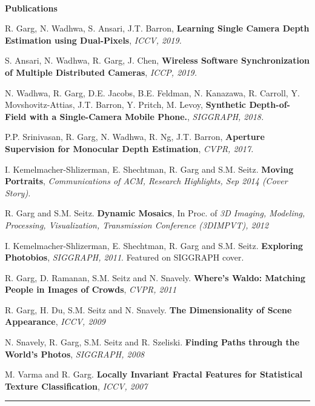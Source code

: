 \documentclass[10pt]{article}
\newenvironment{itemize*}%
  {\begin{itemize}%
    \setlength{\itemsep}{0pt}%
    \setlength{\parskip}{0pt}%
	}
  {\end{itemize}}
\begin{document}
\\
\vspace{0.10in}
{\large \textbf{Publications}}
\begin{itemize*}
\item R. Garg, N. Wadhwa, S. Ansari, J.T. Barron, \textbf{Learning Single Camera Depth Estimation using Dual-Pixels}, \emph{ICCV, 2019.}
\item S. Ansari, N. Wadhwa, R. Garg, J. Chen, \textbf{Wireless Software Synchronization of Multiple Distributed Cameras}, \emph{ICCP, 2019.}
\item N. Wadhwa, R. Garg, D.E. Jacobs, B.E. Feldman, N. Kanazawa, R. Carroll, Y. Movshovitz-Attias, J.T. Barron, Y. Pritch, M. Levoy, \textbf{Synthetic Depth-of-Field with a Single-Camera Mobile Phone.}, \emph{SIGGRAPH, 2018.}
\item P.P. Srinivasan, R. Garg, N. Wadhwa, R. Ng, J.T. Barron, \textbf{Aperture Supervision for Monocular Depth Estimation}, \emph{CVPR, 2017.}
\item I. Kemelmacher-Shlizerman, E. Shechtman, R. Garg and S.M. Seitz. \textbf{Moving Portraits}, \emph{Communications of ACM, Research Highlights, Sep 2014 (Cover Story).}
\item R. Garg and S.M. Seitz. \textbf{Dynamic Mosaics}, In Proc. of \emph{3D Imaging, Modeling, Processing, Visualization, Transmission Conference (3DIMPVT), 2012}
\item I. Kemelmacher-Shlizerman, E. Shechtman, R. Garg and S.M. Seitz. \textbf{Exploring Photobios}, \emph{SIGGRAPH, 2011}. Featured on SIGGRAPH cover.
\item R. Garg, D. Ramanan, S.M. Seitz and N. Snavely. \textbf{Where's Waldo: Matching People in Images of Crowds}, \emph{CVPR, 2011}
\item R. Garg, H. Du, S.M. Seitz and N. Snavely. \textbf{The Dimensionality of Scene Appearance}, \emph{ICCV, 2009}
\item N. Snavely, R. Garg, S.M. Seitz and R. Szeliski. \textbf{Finding Paths through the World's Photos}, \emph{SIGGRAPH, 2008}
\item M. Varma and R. Garg. \textbf{Locally Invariant Fractal Features for Statistical Texture Classification}, \emph{ICCV, 2007} 
\end{itemize*}
\rule{6.5in}{2pt}
\end{document}
